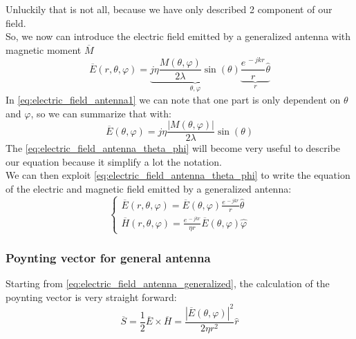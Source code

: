 Unluckily that is not all, because we have only described 2 component of our field.\\
So, we now can introduce the electric field emitted by a generalized antenna with magnetic moment $\overline{M}$
\begin{equation}\label{eq:electric_field_antenna1}
    \overline{E}(r,\theta,\varphi)=\underbrace{j\eta\frac{M(\theta,\varphi)}{2\lambda}\sin(\theta)}_{\theta,\varphi}\underbrace{\frac{e^{\,-jkr}}{r}\hat{\theta}}_r
\end{equation}
In \cref{eq:electric_field_antenna1} we can note that one part is only dependent on $\theta$ and $\varphi$, so we can summarize that with:
\begin{equation}\label{eq:electric_field_antenna_theta_phi}
    \overline{E}(\theta,\varphi)=j\eta\frac{|M(\theta,\varphi)|}{2\lambda}\sin(\theta)
\end{equation}
The \cref{eq:electric_field_antenna_theta_phi} will become very useful to describe our equation because it simplify a lot the notation.\\
We can then exploit \cref{eq:electric_field_antenna_theta_phi} to write the equation of the electric and magnetic field emitted by a generalized antenna:
\begin{equation}\label{eq:electric_field_antenna_generalized}
    \begin{cases}
        \overline{E}(r,\theta,\varphi) =  \overline{E}(\theta,\varphi)\frac{e^{\,-jkr}}{r}\hat{\theta}\\
        \overline{H}(r,\theta,\varphi) = \frac{e^{\,-jkr}}{\eta r} \overline{E}(\theta,\varphi)\hat{\varphi}
    \end{cases}
\end{equation}
\subsubsection*{Poynting vector for general antenna}
Starting from \cref{eq:electric_field_antenna_generalized}, the calculation of the poynting vector is very straight forward:
\begin{equation}
        \overline{S}=\frac{1}{2}\overline{E}\times\overline{H}=\frac{|\overline{E}(\theta,\varphi)|^2}{2\eta r^2}\hat{r}
\end{equation}
